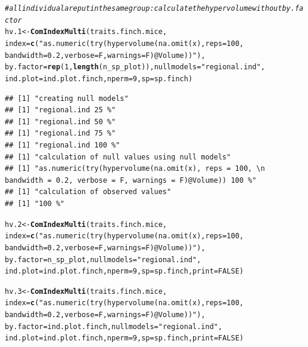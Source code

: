 \documentclass[12pt]{article}\usepackage[]{graphicx}\usepackage[]{color}
\makeatletter
\newcommand{\hlnum}[1]{\textcolor[rgb]{0.686,0.059,0.569}{#1}}%
\newcommand{\hlstr}[1]{\textcolor[rgb]{0.192,0.494,0.8}{#1}}%
\newcommand{\hlcom}[1]{\textcolor[rgb]{0.678,0.584,0.686}{\textit{#1}}}%
\newcommand{\hlstd}[1]{\textcolor[rgb]{0.345,0.345,0.345}{#1}}%
\newcommand{\hlkwb}[1]{\textcolor[rgb]{0.69,0.353,0.396}{#1}}%
\newcommand{\hlkwc}[1]{\textcolor[rgb]{0.333,0.667,0.333}{#1}}%
\newcommand{\hlkwd}[1]{\textcolor[rgb]{0.737,0.353,0.396}{\textbf{#1}}}%
\newenvironment{kframe}{%
 \def\at@end@of@kframe{}%
 \ifinner\ifhmode%
  \def\at@end@of@kframe{\end{minipage}}%
  \begin{minipage}{\columnwidth}%
 \fi\fi%
 \def\FrameCommand##1{\hskip\@totalleftmargin \hskip-\fboxsep
 \colorbox{shadecolor}{##1}\hskip-\fboxsep
     \hskip-\linewidth \hskip-\@totalleftmargin \hskip\columnwidth}%
 \MakeFramed {\advance\hsize-\width
   \@totalleftmargin\z@ \linewidth\hsize
   \@setminipage}}%
 {\par\unskip\endMakeFramed%
 \at@end@of@kframe}
\newenvironment{knitrout}{}{} %
\makeatother
\begin{document}
\begin{knitrout}
\color{fgcolor}\begin{kframe}
\begin{alltt}
\hlcom{#all individual are put in the same group: calculate the hypervolume without by.factor}
\hlstd{hv.1}\hlkwb{<-}\hlkwd{ComIndexMulti}\hlstd{(traits.finch.mice,}
             \hlkwc{index} \hlstd{=} \hlkwd{c}\hlstd{(}\hlstr{"as.numeric(try(hypervolume(na.omit(x), reps = 100, 
                 bandwidth = 0.2, verbose = F, warnings = F)@Volume))"}\hlstd{),}
             \hlkwc{by.factor} \hlstd{=} \hlkwd{rep}\hlstd{(}\hlnum{1}\hlstd{,}\hlkwd{length}\hlstd{(n_sp_plot)),} \hlkwc{nullmodels} \hlstd{=} \hlstr{"regional.ind"}\hlstd{,}
             \hlkwc{ind.plot} \hlstd{= ind.plot.finch,} \hlkwc{nperm} \hlstd{=} \hlnum{9}\hlstd{,} \hlkwc{sp} \hlstd{= sp.finch)}
\end{alltt}
\begin{verbatim}
## [1] "creating null models"
## [1] "regional.ind 25 %"
## [1] "regional.ind 50 %"
## [1] "regional.ind 75 %"
## [1] "regional.ind 100 %"
## [1] "calculation of null values using null models"
## [1] "as.numeric(try(hypervolume(na.omit(x), reps = 100, \n                 bandwidth = 0.2, verbose = F, warnings = F)@Volume)) 100 %"
## [1] "calculation of observed values"
## [1] "100 %"
\end{verbatim}
\begin{alltt}
\hlstd{hv.2}\hlkwb{<-}\hlkwd{ComIndexMulti}\hlstd{(traits.finch.mice,}
             \hlkwc{index} \hlstd{=} \hlkwd{c}\hlstd{(}\hlstr{"as.numeric(try(hypervolume(na.omit(x), reps = 100, 
                 bandwidth = 0.2, verbose = F, warnings = F)@Volume))"}\hlstd{),}
             \hlkwc{by.factor} \hlstd{= n_sp_plot,} \hlkwc{nullmodels} \hlstd{=} \hlstr{"regional.ind"}\hlstd{,}
             \hlkwc{ind.plot} \hlstd{= ind.plot.finch,} \hlkwc{nperm} \hlstd{=} \hlnum{9}\hlstd{,} \hlkwc{sp} \hlstd{= sp.finch,} \hlkwc{print} \hlstd{=} \hlnum{FALSE}\hlstd{)}

\hlstd{hv.3}\hlkwb{<-}\hlkwd{ComIndexMulti}\hlstd{(traits.finch.mice,}
             \hlkwc{index} \hlstd{=} \hlkwd{c}\hlstd{(}\hlstr{"as.numeric(try(hypervolume(na.omit(x), reps = 100,
                 bandwidth = 0.2, verbose = F, warnings = F)@Volume))"}\hlstd{),}
             \hlkwc{by.factor} \hlstd{= ind.plot.finch,} \hlkwc{nullmodels} \hlstd{=}\hlstr{"regional.ind"}\hlstd{,}
             \hlkwc{ind.plot} \hlstd{= ind.plot.finch,} \hlkwc{nperm} \hlstd{=} \hlnum{9}\hlstd{,} \hlkwc{sp} \hlstd{= sp.finch,} \hlkwc{print} \hlstd{=} \hlnum{FALSE}\hlstd{)}


\end{alltt}
\end{kframe}
\end{knitrout}
\end{document}
